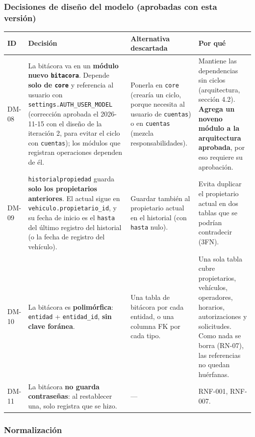 \subsubsection{Decisiones de diseño del modelo (aprobadas con esta versión)}

\begin{longtable}{>{\raggedright\arraybackslash}p{1.5cm}>{\raggedright\arraybackslash}p{4.8cm}>{\raggedright\arraybackslash}p{3.8000000000000003cm}>{\raggedright\arraybackslash}p{4.3cm}}
\toprule
\textbf{ID} & \textbf{Decisión} & \textbf{Alternativa descartada} & \textbf{Por qué}\\
\midrule\endhead
DM-08 & La bitácora va en un \textbf{módulo nuevo \texttt{bitacora}}. Depende \textbf{solo de \texttt{core}} y referencia al usuario con \texttt{settings.AUTH\_USER\_MODEL} (corrección aprobada el 2026-11-15 con el diseño de la iteración 2, para evitar el ciclo con \texttt{cuentas}); los módulos que registran operaciones dependen de él. & Ponerla en \texttt{core} (crearía un ciclo, porque necesita al usuario de \texttt{cuentas}) o en \texttt{cuentas} (mezcla responsabilidades). & Mantiene las dependencias sin ciclos (arquitectura, sección 4.2). \textbf{Agrega un noveno módulo a la arquitectura aprobada}, por eso requiere su aprobación.\\
DM-09 & \texttt{historialpropiedad} guarda \textbf{solo los propietarios anteriores}. El actual sigue en \texttt{vehiculo.propietario\_id}, y su fecha de inicio es el \texttt{hasta} del último registro del historial (o la fecha de registro del vehículo). & Guardar también al propietario actual en el historial (con \texttt{hasta} nulo). & Evita duplicar el propietario actual en dos tablas que se podrían contradecir (3FN).\\
DM-10 & La bitácora es \textbf{polimórfica}: \texttt{entidad} + \texttt{entidad\_id}, \textbf{sin clave foránea}. & Una tabla de bitácora por cada entidad, o una columna FK por cada tipo. & Una sola tabla cubre propietarios, vehículos, operadores, horarios, autorizaciones y solicitudes. Como nada se borra (RN-07), las referencias no quedan huérfanas.\\
DM-11 & La bitácora \textbf{no guarda contraseñas}: al restablecer una, solo registra que se hizo. & --- & RNF-001, RNF-007.\\
\bottomrule
\end{longtable}


\subsubsection{Normalización}

